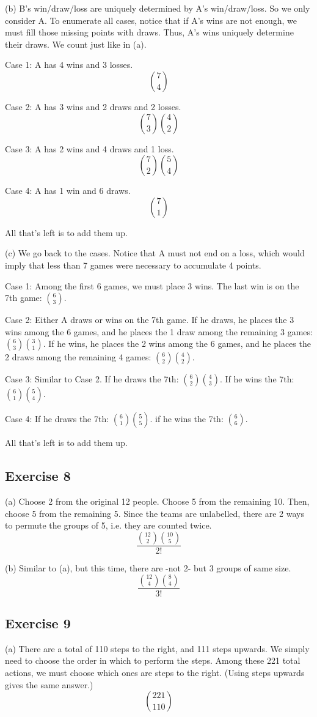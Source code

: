 \documentclass{book}
\begin{document}
\noindent
(b) B's win/draw/loss are uniquely determined by A's win/draw/loss. So we only consider A. To enumerate all cases, notice that if A's wins are not enough, we must fill those missing points with draws. Thus, A's wins uniquely determine their draws. We count just like in (a).

Case 1: A has 4 wins and 3 losses.
$$\binom{7}{4}$$

Case 2: A has 3 wins and 2 draws and 2 losses.
$$\binom{7}{3} \binom{4}{2}$$

Case 3: A has 2 wins and 4 draws and 1 loss.
$$\binom{7}{2} \binom{5}{4}$$

Case 4: A has 1 win and 6 draws.
$$\binom{7}{1}$$

All that's left is to add them up.

\noindent
(c) We go back to the cases. Notice that A must not end on a loss, which would imply that less than 7 games were necessary to accumulate 4 points.

Case 1: Among the first 6 games, we must place 3 wins. The last win is on the 7th game:
$\binom{6}{3}$.

Case 2: Either A draws or wins on the 7th game. If he draws, he places the 3 wins among the 6 games, and he places the 1 draw among the remaining 3 games:
$\binom{6}{3} \binom{3}{1}$.
If he wins, he places the 2 wins among the 6 games, and he places the 2 draws among the remaining 4 games:
$\binom{6}{2} \binom{4}{2}$.

Case 3: Similar to Case 2. If he draws the 7th:
$\binom{6}{2} \binom{4}{3}$.
If he wins the 7th:
$\binom{6}{1} \binom{5}{4}$.

Case 4: If he draws the 7th:
$\binom{6}{1} \binom{5}{5}$.
if he wins the 7th:
$\binom{6}{6}$.

All that's left is to add them up.

\subsection*{Exercise 8}
(a) Choose 2 from the original 12 people. Choose 5 from the remaining 10. Then, choose 5 from the remaining 5. Since the teams are unlabelled, there are 2 ways to permute the groups of 5, i.e. they are counted twice.
$$\frac{\binom{12}{2} \binom{10}{5}}{2!}$$

\noindent
(b) Similar to (a), but this time, there are -not 2- but 3 groups of same size.
$$\frac{\binom{12}{4} \binom{8}{4}}{3!}$$

\subsection*{Exercise 9}
(a) There are a total of 110 steps to the right, and 111 steps upwards. We simply need to choose the order in which to perform the steps. Among these 221 total actions, we must choose which ones are steps to the right. (Using steps upwards gives the same answer.)
$$\binom{221}{110}$$
\end{document}
